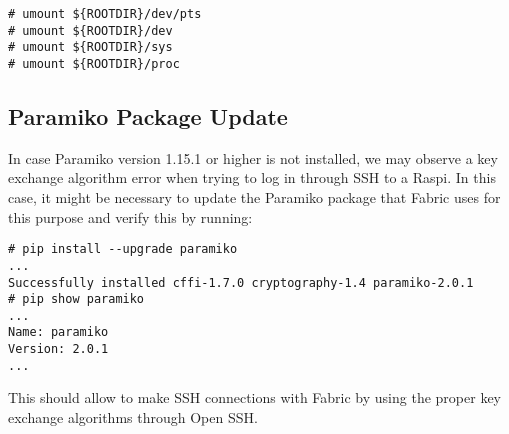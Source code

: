 \begin{lstlisting}[]
# umount ${ROOTDIR}/dev/pts
# umount ${ROOTDIR}/dev
# umount ${ROOTDIR}/sys
# umount ${ROOTDIR}/proc
\end{lstlisting}
\FloatBarrier
\vspace{-5mm}

\subsection{Paramiko Package Update}
\label{sec:paramiko}
In case Paramiko version 1.15.1 or higher is not installed, we may observe
a key exchange algorithm error when trying to log in through \ac{SSH} to a
Raspi. In this case, it might be necessary to update the Paramiko package
that Fabric uses for this purpose and verify this by running:

\begin{lstlisting}[]
# pip install --upgrade paramiko
...
Successfully installed cffi-1.7.0 cryptography-1.4 paramiko-2.0.1
# pip show paramiko
...
Name: paramiko
Version: 2.0.1
...
\end{lstlisting}
\FloatBarrier
\vspace{-5mm}

This should allow to make \ac{SSH} connections with Fabric by using the proper
key exchange algorithms through Open SSH.
